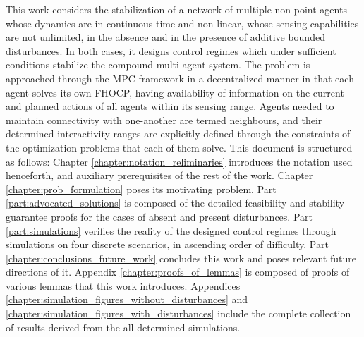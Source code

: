 This work considers the stabilization of a network of multiple non-point agents
whose dynamics are in continuous time and non-linear, whose sensing
capabilities are not unlimited, in the absence and in the presence of additive
bounded disturbances. In both cases, it designs control regimes which under
sufficient conditions stabilize the compound multi-agent system.
The problem is approached through the MPC framework in a
decentralized manner in that each agent solves its own FHOCP, having
availability of information on the current and planned actions of all agents
within its sensing range. Agents needed to maintain connectivity with one-another
are termed neighbours, and their determined interactivity ranges are explicitly
defined through the constraints of the optimization problems that each of them
solve. This document is structured as follows:
Chapter \ref{chapter:notation_reliminaries} introduces the notation used
henceforth, and auxiliary prerequisites of the rest of the work.
Chapter \ref{chapter:prob_formulation} poses its motivating problem.
Part \ref{part:advocated_solutions} is composed of the detailed feasibility
and stability guarantee proofs for the cases of absent and present
disturbances.
Part \ref{part:simulations} verifies the reality of the designed control regimes
through simulations on four discrete scenarios, in ascending order of
difficulty.
Part \ref{chapter:conclusions_future_work} concludes this work and poses
relevant future directions of it.
Appendix \ref{chapter:proofs_of_lemmas} is composed of proofs of various lemmas
that this work introduces.
Appendices \ref{chapter:simulation_figures_without_disturbances} and
\ref{chapter:simulation_figures_with_disturbances} include the complete
collection of results derived from the all determined simulations.
